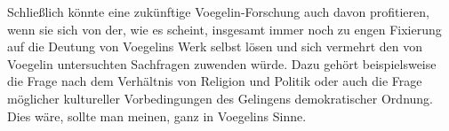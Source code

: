 Schließlich könnte eine zukünftige Voegelin-Forschung auch davon profitieren,
wenn sie sich von der, wie es scheint, insgesamt immer noch zu engen Fixierung
auf die Deutung von Voegelins Werk selbst lösen und sich vermehrt den von
Voegelin untersuchten Sachfragen zuwenden würde. Dazu gehört beispielsweise
die Frage nach dem Verhältnis von Religion und Politik oder auch die Frage
möglicher kultureller Vorbedingungen des Gelingens demokratischer
Ordnung. Dies wäre, sollte man meinen, ganz in Voegelins Sinne.











